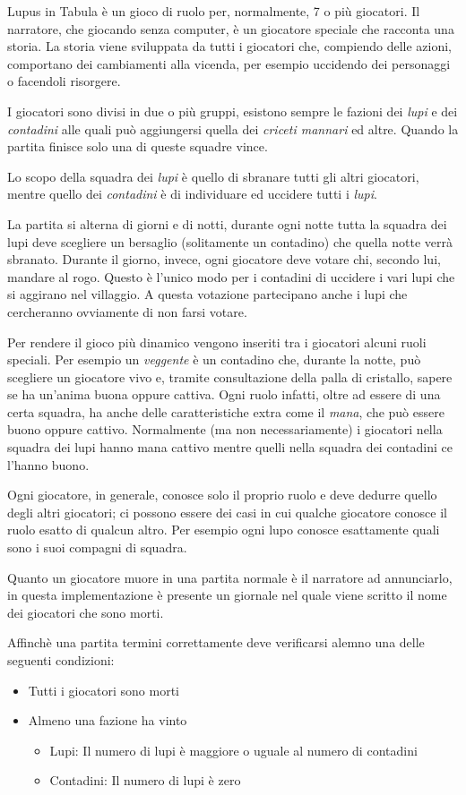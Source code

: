 Lupus in Tabula è un gioco di ruolo per, normalmente, 7 o più giocatori. Il narratore, che giocando senza computer, è un giocatore speciale che racconta una storia. La storia viene sviluppata da tutti i giocatori che, compiendo delle azioni, comportano dei cambiamenti alla vicenda, per esempio uccidendo dei personaggi o facendoli risorgere.

I giocatori sono divisi in due o più gruppi, esistono sempre le fazioni dei \emph{lupi} e dei \emph{contadini} alle quali può aggiungersi quella dei \emph{criceti mannari} ed altre. Quando la partita finisce solo una di queste squadre vince.

Lo scopo della squadra dei \emph{lupi} è quello di sbranare tutti gli altri giocatori, mentre quello dei \emph{contadini} è di individuare ed uccidere tutti i \emph{lupi}.

La partita si alterna di giorni e di notti, durante ogni notte tutta la squadra dei lupi deve scegliere un bersaglio (solitamente un contadino) che quella notte verrà sbranato. Durante il giorno, invece, ogni giocatore deve votare chi, secondo lui, mandare al rogo. Questo è l'unico modo per i contadini di uccidere i vari lupi che si aggirano nel villaggio. A questa votazione partecipano anche i lupi che cercheranno ovviamente di non farsi votare.

Per rendere il gioco più dinamico vengono inseriti tra i giocatori alcuni ruoli speciali. Per esempio un \emph{veggente} è un contadino che, durante la notte, può scegliere un giocatore vivo e, tramite consultazione della palla di cristallo, sapere se ha un'anima buona oppure cattiva. Ogni ruolo infatti, oltre ad essere di una certa squadra, ha anche delle caratteristiche extra come il \emph{mana}, che può essere buono oppure cattivo. Normalmente (ma non necessariamente) i giocatori nella squadra dei lupi hanno mana cattivo mentre quelli nella squadra dei contadini ce l'hanno buono.

Ogni giocatore, in generale, conosce solo il proprio ruolo e deve dedurre quello degli altri giocatori; ci possono essere dei casi in cui qualche giocatore conosce il ruolo esatto di qualcun altro. Per esempio ogni lupo conosce esattamente quali sono i suoi compagni di squadra.

Quanto un giocatore muore in una partita normale è il narratore ad annunciarlo, in questa implementazione è presente un giornale nel quale viene scritto il nome dei giocatori che sono morti.

Affinchè una partita termini correttamente deve verificarsi alemno una delle seguenti condizioni:

\begin{itemize}
	\item Tutti i giocatori sono morti
	\item Almeno una fazione ha vinto
	\begin{itemize}
		\item Lupi: Il numero di lupi è maggiore o uguale al numero di contadini
		\item Contadini: Il numero di lupi è zero
	\end{itemize}
\end{itemize}